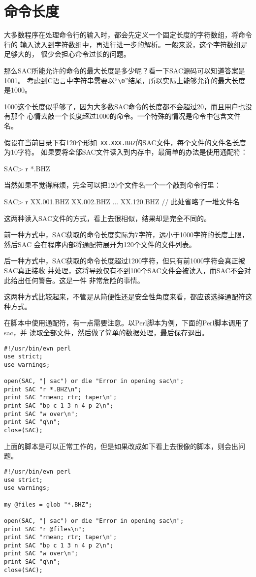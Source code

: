 \section{命令长度}
大多数程序在处理命令行的输入时，都会先定义一个固定长度的字符数组，将命令行的
输入读入到字符数组中，再进行进一步的解析。一般来说，这个字符数组是足够大的，
很少会担心命令过长的问题。

那么SAC所能允许的命令的最大长度是多少呢？看一下SAC源码可以知道答案是1001。
考虑到C语言中字符串需要以``\verb+\0+''结尾，所以实际上能够允许的最大长度是1000。

1000这个长度似乎够了，因为大多数SAC命令的长度都不会超过20，而且用户也没有那个
心情去敲一个长度超过1000的命令。一个特殊的情况是命令中包含文件名。

假设在当前目录下有120个形如~\verb+XX.XXX.BHZ+的SAC文件，每个文件的文件名长度为10字符。
如果要将全部SAC文件读入到内存中，最简单的办法是使用通配符：
\begin{SACCode}
SAC> r *.BHZ
\end{SACCode}
当然如果不觉得麻烦，完全可以把120个文件名一个一个敲到命令行里：
\begin{SACCode}
SAC> r XX.001.BHZ XX.002.BHZ ... XX.120.BHZ // 此处省略了一堆文件名
\end{SACCode}

这两种读入SAC文件的方式，看上去很相似，结果却是完全不同的。

前一种方式中，SAC获取的命令长度实际为7字符，远小于1000字符的长度上限，然后SAC
会在程序内部将通配符展开为120个文件的文件列表。

后一种方式中，SAC获取的命令长度超过1200字符，但只有前1000字符会真正被SAC真正接收
并处理，这将导致仅有不到100个SAC文件会被读入，而SAC不会对此给出任何警告。这是一件
非常危险的事情。

这两种方式比较起来，不管是从简便性还是安全性角度来看，都应该选择通配符这种方式。

在脚本中使用通配符，有一点需要注意。以Perl脚本为例，下面的Perl脚本调用了sac，并
读取全部文件，然后做了简单的数据处理，最后保存退出。

\begin{verbatim}
#!/usr/bin/evn perl
use strict;
use warnings;

open(SAC, "| sac") or die "Error in opening sac\n";
print SAC "r *.BHZ\n";
print SAC "rmean; rtr; taper\n";
print SAC "bp c 1 3 n 4 p 2\n";
print SAC "w over\n";
print SAC "q\n";
close(SAC);
\end{verbatim}

上面的脚本是可以正常工作的，但是如果改成如下看上去很像的脚本，则会出问题。
\begin{verbatim}
#!/usr/bin/evn perl
use strict;
use warnings;

my @files = glob "*.BHZ";

open(SAC, "| sac") or die "Error in opening sac\n";
print SAC "r @files\n";
print SAC "rmean; rtr; taper\n";
print SAC "bp c 1 3 n 4 p 2\n";
print SAC "w over\n";
print SAC "q\n";
close(SAC);
\end{verbatim}

